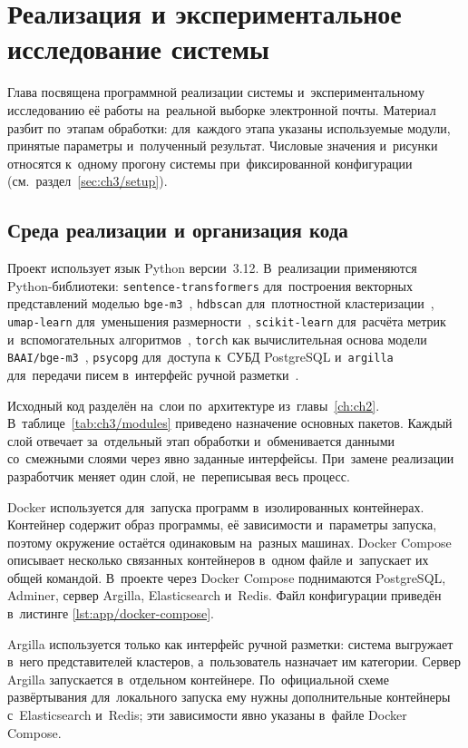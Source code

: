 \chapter{Реализация и экспериментальное исследование системы}\label{ch:ch3}

Глава посвящена программной реализации системы и~экспериментальному
исследованию её работы на~реальной выборке электронной почты. Материал разбит
по~этапам обработки: для~каждого этапа указаны используемые модули, принятые
параметры и~полученный результат. Числовые значения и~рисунки относятся
к~одному прогону системы при~фиксированной конфигурации
(см.~раздел~\ref{sec:ch3/setup}).

\section{Среда реализации и организация кода}\label{sec:ch3/impl}

Проект использует язык Python версии~3.12. В~реализации применяются
Python-библиотеки: \texttt{sentence-transformers} для~построения векторных
представлений моделью \texttt{bge-m3}~\cite{Chen2024BGEM3}, \texttt{hdbscan}
для~плотностной кластеризации~\cite{McInnes2017HDBSCAN}, \texttt{umap-learn}
для~уменьшения размерности~\cite{McInnes2018UMAP}, \texttt{scikit-learn}
для~расчёта метрик и~вспомогательных алгоритмов~\cite{Pedregosa2011sklearn},
\texttt{torch} как вычислительная основа модели
\texttt{BAAI/bge-m3}~\cite{Paszke2019PyTorch}, \texttt{psycopg} для~доступа
к~СУБД PostgreSQL и~\texttt{argilla} для~передачи писем в~интерфейс ручной
разметки~\cite{Vila2023Argilla}.

Исходный код разделён на~слои по~архитектуре
из~главы~\ref{ch:ch2}. В~таблице~\ref{tab:ch3/modules} приведено назначение
основных пакетов. Каждый слой отвечает за~отдельный этап обработки и~обменивается
данными со~смежными слоями через явно заданные интерфейсы. При~замене реализации
разработчик меняет один слой, не~переписывая весь процесс.

Docker используется для~запуска программ в~изолированных контейнерах. Контейнер
содержит образ программы, её зависимости и~параметры запуска, поэтому окружение
остаётся одинаковым на~разных машинах. Docker Compose описывает несколько
связанных контейнеров в~одном файле и~запускает их общей командой. В~проекте
через Docker Compose поднимаются PostgreSQL, Adminer, сервер Argilla,
Elasticsearch и~Redis. Файл конфигурации приведён в~листинге
\ref{lst:app/docker-compose}.

Argilla используется только как интерфейс ручной разметки: система выгружает
в~него представителей кластеров, а~пользователь назначает им категории. Сервер
Argilla запускается в~отдельном контейнере. По~официальной схеме развёртывания
для~локального запуска ему нужны дополнительные контейнеры с~Elasticsearch
и~Redis; эти зависимости явно указаны в~файле Docker Compose.

